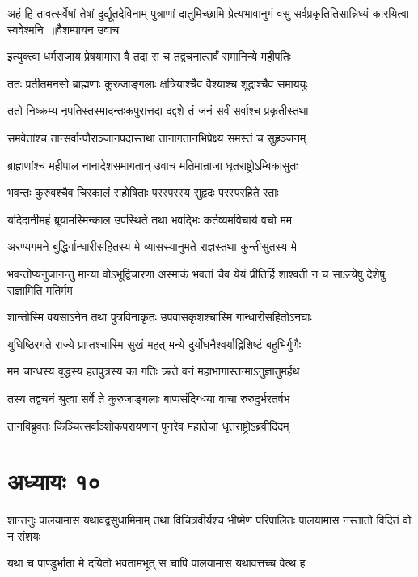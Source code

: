 \fourlineindentedshloka
{अहं हि तावत्सर्वेषां तेषां दुर्द्यूतदेविनाम्}
{पुत्राणां दातुमिच्छामि प्रेत्यभावानुगं वसु}
{सर्वप्रकृतितिसान्निध्यं कारयित्वा स्ववेश्मनि ॥वैशम्पायन उवाच}
{}


\twolineshloka
{इत्युक्त्वा धर्मराजाय प्रेषयामास वै तदा}
{स च तद्वचनात्सर्वं समानिन्ये महीपतिः}


\twolineshloka
{ततः प्रतीतमनसो ब्राह्मणाः कुरुजाङ्गलाः}
{क्षत्रियाश्चैव वैश्याश्च शूद्राश्चैव समाययुः}


\twolineshloka
{ततो निष्क्रम्य नृपतिस्तस्मादन्तःकपुरात्तदा}
{दद्दशे तं जनं सर्वं सर्वाश्च प्रकृतीस्तथा}


\twolineshloka
{समवेतांश्च तान्सर्वान्पौराञ्जानपदांस्तथा}
{तानागतानभिप्रेक्ष्य समस्तं च सुहृञ्जनम्}


\twolineshloka
{ब्राह्मणांश्च महीपाल नानादेशसमागतान्}
{उवाच मतिमान्राजा धृतराष्ट्रोऽम्बिकासुतः}


\twolineshloka
{भवन्तः कुरुवश्चैव चिरकालं सहोषिताः}
{परस्परस्य सुहृदः परस्परहिते रताः}


\twolineshloka
{यदिदानीमहं ब्रूयामस्मिन्काल उपस्थिते}
{तथा भवद्भिः कर्तव्यमविचार्य वचो मम}


\twolineshloka
{अरण्यगमने बुद्धिर्गान्धारीसहितस्य मे}
{व्यासस्यानुमते राज्ञस्तथा कुन्तीसुतस्य मे}


भवन्तोप्यनुजानन्तु मान्या वोऽभूद्विचारणा
\twolineshloka
{अस्माकं भवतां चैव येयं प्रीतिर्हि शाश्वती}
{न च साऽन्येषु देशेषु राज्ञामिति मतिर्मम}


\twolineshloka
{शान्तोस्मि वयसाऽनेन तथा पुत्रविनाकृतः}
{उपवासकृशश्चास्मि गान्धारीसहितोऽनघाः}


\twolineshloka
{युधिष्ठिरगते राज्ये प्राप्तश्चास्मि सुखं महत्}
{मन्ये दुर्योधनैश्वर्याद्विशिष्टं बहुभिर्गुणैः}


\twolineshloka
{मम चान्धस्य वृद्धस्य हतपुत्रस्य का गतिः}
{ऋते वनं महाभागास्तन्माऽनुज्ञातुमर्हथ}


\twolineshloka
{तस्य तद्वचनं श्रुत्वा सर्वे ते कुरुजाङ्गलाः}
{बाप्पसंदिग्धया वाचा रुरुदुर्भरतर्षभ}


\twolineshloka
{तानविब्रुवतः किञ्चित्सर्वाञ्शोकपरायणान्}
{पुनरेव महातेजा धृतराष्ट्रोऽब्रवीदिदम्}


\chapter{अध्यायः १०}
\threelineshloka
{शान्तनुः पालयामास यथावद्वसुधामिमाम्}
{तथा विचित्रवीर्यश्च भीष्मेण परिपालितः}
{पालयामास नस्तातो विदितं वो न संशयः}


\twolineshloka
{यथा च पाण्डुर्भाता मे दयितो भवतामभूत्}
{स चापि पालयामास यथावत्तच्च वेत्थ ह}


